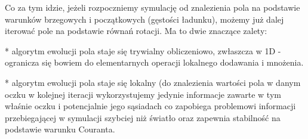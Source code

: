     Co za tym idzie, jeżeli rozpoczniemy symulację od znalezienia pola na
    podstawie warunków brzegowych i początkowych (gęstości ładunku), możemy już
    dalej iterować pole na podstawie równań rotacji. Ma to dwie znaczące
    zalety:

    * algorytm ewolucji pola staje się trywialny obliczeniowo,
    zwłaszcza w 1D - ogranicza się bowiem do elementarnych operacji lokalnego
    dodawania i mnożenia.

    * algorytm ewolucji pola staje się lokalny (do
    znalezienia wartości pola w danym oczku w kolejnej iteracji wykorzystujemy
    jedynie informacje zawarte w tym właśnie oczku i potencjalnie jego
    sąsiadach  co zapobiega
    problemowi informacji przebiegającej w symulacji szybciej niż światło oraz
    zapewnia stabilność na podstawie warunku Couranta.




